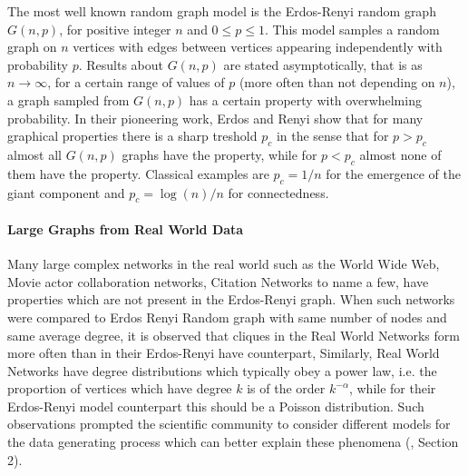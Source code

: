\documentclass{article}
\begin{document}
The most well known random graph model is the Erdos-Renyi random graph $G(n,p)$, for positive integer $n$ and $0\leq p\leq 1$. This model samples a random graph on $n$ vertices with edges between vertices appearing independently with probability $p$. Results about $G(n,p)$ are stated  asymptotically, that is as $n\to\infty$, for a certain range of values of $p$ (more often than not depending on $n$), a graph sampled from $G(n,p)$ has a certain property with overwhelming probability. In their pioneering work, Erdos and Renyi show that for many graphical properties there is a sharp treshold $p_c$ in the sense that for $p>p_c$ almost all $G(n,p)$ graphs have the property, while for $p<p_c$ almost none of them have the property. Classical examples are $p_c=1/n$ for the emergence of the giant component and $p_c=\log(n)/n$ for connectedness. 


\paragraph{Large Graphs from Real World Data}

Many large complex networks in the real world such as the World Wide Web, Movie actor collaboration networks, Citation Networks to name a few, have properties which are not present in the Erdos-Renyi graph. When such networks were compared to Erdos Renyi Random graph with same number of nodes and same average degree, it is observed that cliques in the Real World Networks form more often than in their Erdos-Renyi have  counterpart, Similarly, Real World Networks have degree distributions which typically obey a power law, i.e. the proportion of vertices which have degree $k$ is of the order $k^{-\alpha}$, while for their Erdos-Renyi model counterpart this should be a Poisson distribution. Such observations prompted the scientific community to consider different models for the data generating process which can better explain these phenomena (\cite{Albert}, Section 2).  
\end{document}

